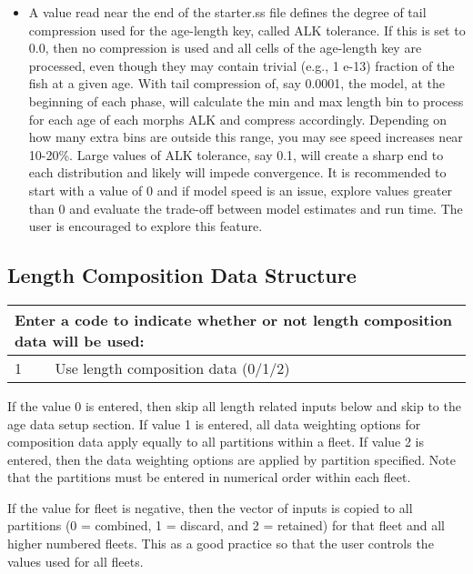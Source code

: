 \begin{itemize}
	\item A value read near the end of the starter.ss file defines the degree of tail compression used for the age-length key, called ALK tolerance.  If this is set to 0.0, then no compression is used and all cells of the age-length key are processed, even though they may contain trivial (e.g., 1 e-13) fraction of the fish at a given age.  With tail compression of, say 0.0001, the model, at the beginning of each phase, will calculate the min and max length bin to process for each age of each morphs ALK and compress accordingly.  Depending on how many extra bins are outside this range, you may see speed increases near 10-20\%.  Large values of ALK tolerance, say 0.1, will create a sharp end to each distribution and likely will impede convergence.  It is recommended to start with a value of 0 and if model speed is an issue, explore values greater than 0 and evaluate the trade-off between model estimates and run time.  The user is encouraged to explore this feature.
\end{itemize}


\subsection{Length Composition Data Structure}
\begin{tabular}{p{2cm} p{13cm}}
		\multicolumn{2}{l}{Enter a code to indicate whether or not length composition data will be used:\Tstrut\Bstrut}\\
		\hline	
		1 & Use length composition data (0/1/2)\Tstrut\Bstrut\\
		\hline									  
\end{tabular}

If the value 0 is entered, then skip all length related inputs below and skip to the age data setup section.  If value 1 is entered, all data weighting options for composition data apply equally to all partitions within a fleet. If value 2 is entered, then the data weighting options are applied by partition specified. Note that the partitions must be entered in numerical order within each fleet.

If the value for fleet is negative, then the vector of inputs is copied to all partitions (0 = combined, 1 = discard, and 2 = retained) for that fleet and all higher numbered fleets. This as a good practice so that the user controls the values used for all fleets.

